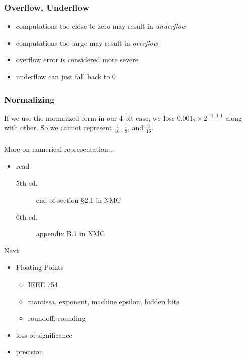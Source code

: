 \documentclass[10pt]{beamer}
\begin{document}
\begin{frame}
\frametitle{Overflow, Underflow}
\begin{center}
\end{center}
\begin{itemize}
  \item computations too close to zero may result in \emph{underflow}
  \item computations too large may result in \emph{overflow}
  \item overflow error is considered more severe
  \item underflow can just fall back to 0
\end{itemize}
\end{frame}
\begin{frame}
\frametitle{Normalizing}
If we use the normalized form in our 4-bit case, we lose $0.001_2\times
2^{-1,0,1}$ along with other.  So we cannot represent
$\frac{1}{16}$,
$\frac{1}{8}$,
and $\frac{3}{16}$.

\begin{center}
\end{center}
\begin{center}
\end{center}

\end{frame}
\begin{frame}
\frametitle{}
More on numerical representation...
\begin{itemize}
  \item read 
    \begin{description}
      \item[5th ed.] end of section \S 2.1 in NMC
      \item[6th ed.] appendix B.1 in NMC
    \end{description}
\end{itemize}

\bigskip
Next:
\begin{itemize}
  \item Floating Points
  \begin{itemize}
    \item IEEE 754
    \item mantissa, exponent, machine epsilon, hidden bits
    \item roundoff, rounding
  \end{itemize}
  \item loss of significance
  \item precision
\end{itemize}
\end{frame}
\end{document}

